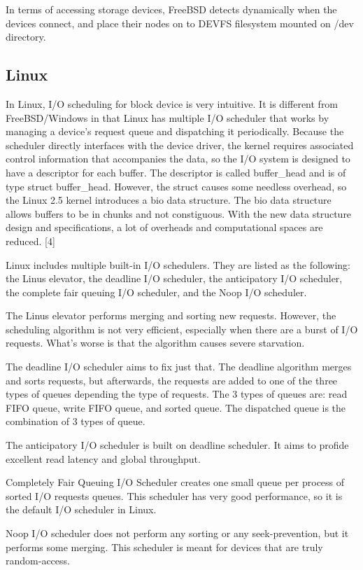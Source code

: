 \documentclass[10pt,a4paper]{article}
\begin{document}
In terms of accessing storage devices, FreeBSD detects dynamically when the devices connect, and place their nodes on to DEVFS filesystem mounted on /dev directory.

\subsection{Linux}
In Linux, I/O scheduling for block device is very intuitive. It is different from FreeBSD/Windows in that Linux has multiple I/O scheduler that works by managing a device’s request queue and dispatching it periodically. Because the scheduler directly interfaces with the device driver, the kernel requires associated control information that accompanies the data, so the I/O system is designed to have a descriptor for each buffer. The descriptor is called buffer\_head and is of type struct buffer\_head. However, the struct causes some needless overhead, so the Linux 2.5 kernel introduces a bio data structure. The bio data structure allows buffers to be in chunks and not constiguous. With the new data structure design and specifications, a lot of overheads and computational spaces are reduced. [4]

Linux includes multiple built-in I/O schedulers. They are listed as the following: the Linus elevator, the deadline I/O scheduler, the anticipatory I/O scheduler, the complete fair queuing I/O scheduler, and the Noop I/O scheduler.

The Linus elevator performs merging and sorting new requests. However, the scheduling algorithm is not very efficient, especially when there are a burst of I/O requests. What’s worse is that the algorithm causes severe starvation.

The deadline I/O scheduler aims to fix just that. The deadline algorithm merges and sorts requests, but afterwards, the requests are added to one of the three types of queues depending the type of requests. The 3 types of queues are: read FIFO queue, write FIFO queue, and sorted queue. The dispatched queue is the combination of 3 types of queue.

The anticipatory I/O scheduler is built on deadline scheduler. It aims to profide excellent read latency and global throughput.

Completely Fair Queuing I/O Scheduler creates one small queue per process of sorted I/O requests queues. This scheduler has very good performance, so it is the default I/O scheduler in Linux.

Noop I/O scheduler does not perform any sorting or any seek-prevention, but it performs some merging. This scheduler is meant for devices that are truly random-access.
\end{document}
